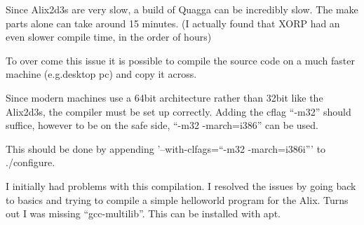 Since Alix2d3s are very slow, a build of Quagga can be incredibly slow. The make parts
alone can take around 15 minutes. (I actually found that XORP had an even slower
compile time, in the order of hours) 

To over come this issue it is possible to compile the source code on a much
faster machine (e.g.\@ desktop pc) and copy it across. 

Since modern machines use a 64bit architecture rather than 32bit like the
Alix2d3s, the compiler must be set up correctly. Adding the cflag ``-m32'' should
suffice, however to be on the safe side, ``-m32 -march=i386'' can be used. 

This should be done by appending '--with-clfags=``-m32 -march=i386i''' to \@./configure.

I initially had problems with this compilation. I resolved the issues by going
back to basics and trying to compile a simple helloworld program for the Alix.
Turns out I was missing ``gcc-multilib''. This can be installed with apt.
